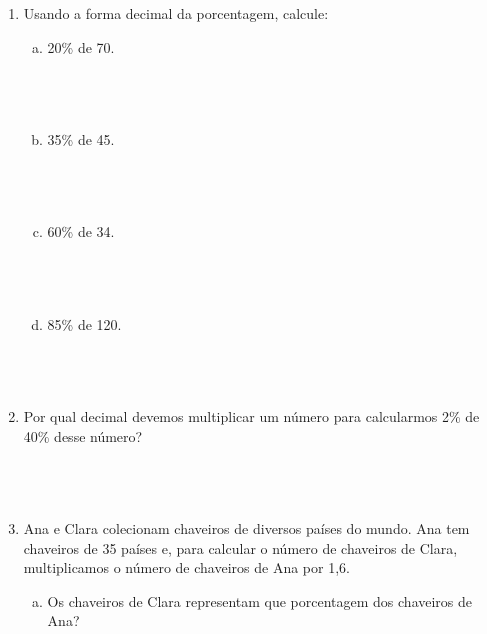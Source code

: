 \documentclass[a4paper,14pt]{article}
\begin{document}
\begin{multicols}{2}
\begin{enumerate}
\begin{enumerate}[a)]
				\item 2,47 \\\\\\\\
				\item 0,803 \\\\\\\\
			\end{enumerate}
			\item Usando a forma decimal da porcentagem, calcule:
			\begin{enumerate}[a)]
				\item 20\% de 70. \\\\\\\\
				\item 35\% de 45. \\\\\\\\
				\item 60\% de 34. \\\\\\\\
				\item 85\% de 120. \\\\\\\\
			\end{enumerate}
			\item Por qual decimal devemos multiplicar um número para calcularmos 2\% de 40\% desse número? \\\\\\\\
			\item Ana e Clara colecionam chaveiros de diversos países do mundo. Ana tem chaveiros de 35 países e, para calcular o número de chaveiros de Clara, multiplicamos o número de chaveiros de Ana por 1,6.
			\begin{enumerate}[a)]
				\item Os chaveiros de Clara representam que porcentagem dos chaveiros de Ana? \\\\\\\\\\\\\\\\\\\\\\\\

\end{enumerate}
\end{enumerate}
\end{multicols}
\end{document}
